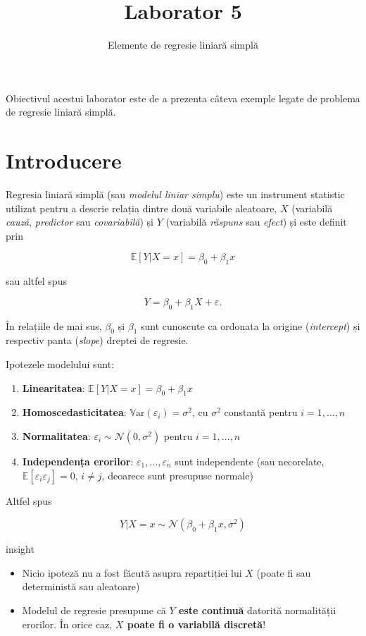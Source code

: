 \documentclass[]{article}
\title{Laborator 5}
\subtitle{Elemente de regresie liniară simplă}
\author{}
\date{}
\providecommand{\tightlist}{%
  \setlength{\itemsep}{0pt}\setlength{\parskip}{0pt}}
\newenvironment{frshaded_insight*}{%
  \def\FrameCommand{\fboxrule=\FrameRule\fboxsep=\FrameSep \fcolorbox{framecolor_insight}{shadecolor_insight}}%
  \MakeFramed {\advance\hsize-\width \FrameRestore}}%
{\endMakeFramed}
\newenvironment{rmdblock_insight}[1]
  {\begin{frshaded_insight*}
  \begin{itemize}
  \renewcommand{\labelitemi}{
    \raisebox{-.7\height}[0pt][0pt]{
      {\setkeys{Gin}{width=2em,keepaspectratio}\texttt{[image: images/icons/\#1]}}
    }
  }
  \item
  }
  {
  \end{itemize}
  \end{frshaded_insight*}
  }
\newenvironment{rmdinsight}
  {\begin{rmdblock_insight}{insight}}
  {\end{rmdblock_insight}}
\begin{document}
\maketitle

\thispagestyle{fancy}

Obiectivul acestui laborator este de a prezenta câteva exemple legate de
problema de regresie liniară simplă.

\section{Introducere}\label{introducere}

Regresia liniară simplă (sau \emph{modelul liniar simplu}) este un
instrument statistic utilizat pentru a descrie relația dintre două
variabile aleatoare, \(X\) (variabilă \emph{cauză}, \emph{predictor} sau
\emph{covariabilă}) și \(Y\) (variabilă \emph{răspuns} sau \emph{efect})
și este definit prin

\[
\mathbb{E}[Y|X=x]=\beta_0+\beta_1x 
\]

sau altfel spus

\[
Y = \beta_0 + \beta_1 X + \varepsilon.
\]

În relațiile de mai sus, \(\beta_0\) și \(\beta_1\) sunt cunoscute ca
ordonata la origine (\emph{intercept}) și respectiv panta (\emph{slope})
dreptei de regresie.

Ipotezele modelului sunt:

\begin{enumerate}
\def\labelenumi{\roman{enumi}.}
\tightlist
\item
  \textbf{Linearitatea}: \(\mathbb{E}[Y|X=x]=\beta_0+\beta_1x\)
\item
  \textbf{Homoscedasticitatea}:
  \(\mathbb{V}\text{ar}(\varepsilon_i)=\sigma^2\), cu \(\sigma^2\)
  constantă pentru \(i=1,\ldots,n\)
\item
  \textbf{Normalitatea}: \(\varepsilon_i\sim\mathcal{N}(0,\sigma^2)\)
  pentru \(i=1,\ldots,n\)
\item
  \textbf{Independența erorilor}: \(\varepsilon_1,\ldots,\varepsilon_n\)
  sunt independente (sau necorelate,
  \(\mathbb{E}[\varepsilon_i\varepsilon_j]=0\), \(i\neq j\), deoarece
  sunt presupuse normale)
\end{enumerate}

Altfel spus

\[
Y|X=x\sim \mathcal{N}(\beta_0+\beta_1x,\sigma^2)
\]

\begin{rmdinsight}
\begin{itemize}
\item
  Nicio ipoteză nu a fost făcută asupra repartiției lui \(X\) (poate fi
  sau deterministă sau aleatoare)
\item
  Modelul de regresie presupune că \textbf{\(Y\) este continuă} datorită
  normalității erorilor. În orice caz, \textbf{\(X\) poate fi o
  variabilă discretă}!
\end{itemize}
\end{rmdinsight}
\end{document}
